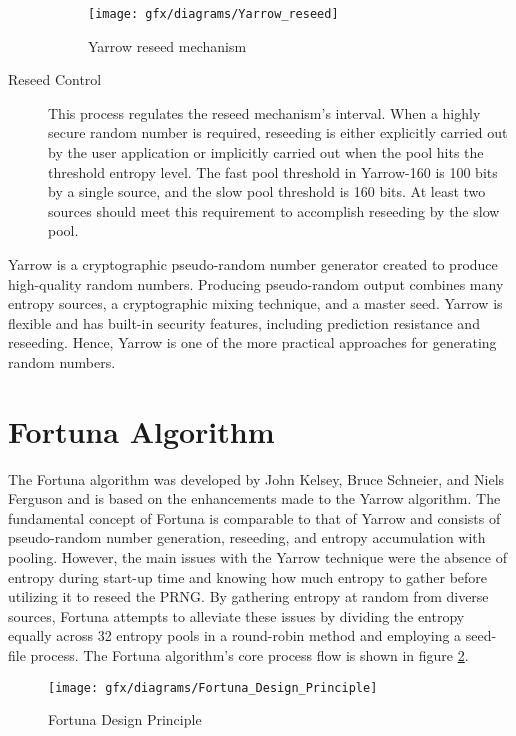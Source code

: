 \begin{description}
	\begin{figure}[htbp]
		\centering
		\texttt{[image: gfx/diagrams/Yarrow\_reseed]}
		\caption{Yarrow reseed mechanism \cite{FTI-2006}}
		\label{fig:3:19}
	\end{figure}
	
	\item[Reseed Control] This process regulates the reseed mechanism’s interval. When a highly secure random number is required, reseeding is either explicitly carried out by the user application or implicitly carried out when the pool hits the threshold entropy level. The fast pool threshold in Yarrow-160 is 100 bits by a single source, and the slow pool threshold is 160 bits. At least two sources should meet this requirement to accomplish reseeding by the slow pool.
	
\end{description}

Yarrow is a cryptographic pseudo-random number generator created to produce high-quality random numbers. Producing pseudo-random output combines many entropy sources, a cryptographic mixing technique, and a master seed. Yarrow is flexible and has built-in security features, including prediction resistance and reseeding. Hence, Yarrow is one of the more practical approaches for generating random numbers.

%
%
\section{Fortuna Algorithm}
\label{sec:SoA:FA}
The Fortuna algorithm \cite{FT-2011} was developed by John Kelsey, Bruce Schneier, and Niels Ferguson and is based on the enhancements made to the Yarrow algorithm. The fundamental concept of Fortuna is comparable to that of Yarrow and consists of pseudo-random number generation, reseeding, and entropy accumulation with pooling. However, the main issues with the Yarrow technique were the absence of entropy during start-up time and knowing how much entropy to gather before utilizing it to reseed the PRNG. By gathering entropy at random from diverse sources, Fortuna attempts to alleviate these issues by dividing the entropy equally across 32 entropy pools in a round-robin method and employing a seed-file process. The Fortuna algorithm’s core process flow is shown in figure \ref{fig:3:11}.
\begin{figure}[htbp]
	\centering
	\texttt{[image: gfx/diagrams/Fortuna\_Design\_Principle]}
	\caption{Fortuna Design Principle \cite{FTI-2006}}
	\label{fig:3:11}
\end{figure}

